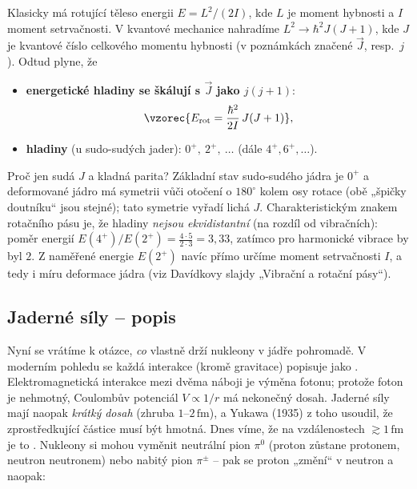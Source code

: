 Klasicky má rotující těleso energii \(E = L^2/(2I)\), kde \(L\) je moment hybnosti a \(I\) moment setrvačnosti.
V kvantové mechanice nahradíme \(L^2 \to \hbar^2 J(J+1)\), kde \(J\) je kvantové číslo celkového momentu hybnosti
(v poznámkách značené \(\vec{J}\), resp.\ \(j\)). Odtud plyne, že
\begin{itemize}
  \item \textbf{energetické hladiny se škálují s \(\vec{J}\) jako \(j(j+1)\)}:
  \[
    \vzorec{E_\text{rot} = \frac{\hbar^2}{2I}\, J(J+1)} ,
  \]
  \item \textbf{hladiny} (u sudo-sudých jader): \(0^+,\ 2^+,\ \dots\) (dále \(4^+, 6^+, \dots\)).
\end{itemize}
Proč jen sudá \(J\) a kladná parita? Základní stav sudo-sudého jádra je \(0^+\) a deformované jádro
má symetrii vůči otočení o \(180^\circ\) kolem osy rotace (obě „špičky doutníku“ jsou stejné);
tato symetrie vyřadí lichá \(J\). Charakteristickým znakem rotačního pásu je, že hladiny \emph{nejsou ekvidistantní}
(na rozdíl od vibračních): poměr energií \(E(4^+)/E(2^+) = \frac{4\cdot5}{2\cdot3} = 3{,}33\), zatímco pro
harmonické vibrace by byl \(2\). Z naměřené energie \(E(2^+)\) navíc přímo určíme moment setrvačnosti \(I\),
a tedy i míru deformace jádra (viz Davídkovy slajdy „Vibrační a rotační pásy“).

\subsection{Jaderné síly -- popis}

Nyní se vrátíme k otázce, \emph{co} vlastně drží nukleony v jádře pohromadě. V moderním pohledu se
každá interakce (kromě gravitace) popisuje jako . Elektromagnetická
interakce mezi dvěma náboji je výměna fotonu; protože foton je nehmotný, Coulombův potenciál
\(V\propto 1/r\) má nekonečný dosah. Jaderné síly mají naopak \emph{krátký dosah} (zhruba \(1\)--\(2\,\mathrm{fm}\)),
a Yukawa (1935) z toho usoudil, že zprostředkující částice musí být hmotná. Dnes víme, že na vzdálenostech
\(\gtrsim 1\,\mathrm{fm}\) je to . Nukleony si mohou vyměnit neutrální pion \(\pi^0\) (proton zůstane protonem,
neutron neutronem) nebo nabitý pion \(\pi^\pm\) -- pak se proton „změní“ v neutron a naopak:

